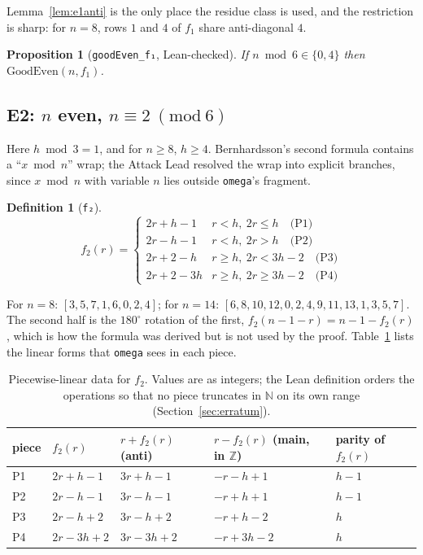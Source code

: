 \documentclass[11pt,a4paper]{article}
\newtheorem{proposition}[theorem]{Proposition}
\theoremstyle{definition}
\newtheorem{definition}[theorem]{Definition}
\theoremstyle{remark}
\newcommand{\lean}[1]{\texttt{#1}}
\newcommand{\N}{\mathbb{N}}
\newcommand{\GoodEven}{\mathrm{GoodEven}}
\begin{document}
Lemma~\ref{lem:e1anti} is the only place the residue class is used, and the restriction is
sharp: for $n=8$, rows $1$ and $4$ of $f_1$ share anti-diagonal $4$.

\begin{proposition}[\lean{goodEven\_f₁}, Lean-checked]
If $n\bmod 6\in\{0,4\}$ then $\GoodEven(n,f_1)$.
\end{proposition}

\subsection{E2: \texorpdfstring{$n$ even, $n \equiv 2 \ (\mathrm{mod}\ 6)$}{n even, n = 2 (mod 6)}}

Here $h\bmod 3=1$, and for $n\ge 8$, $h\ge 4$. Bernhardsson's second formula contains a
``$x \bmod n$'' wrap; the Attack Lead resolved the wrap into explicit branches, since
$x\bmod n$ with variable $n$ lies outside \lean{omega}'s fragment.

\begin{definition}[\lean{f₂}]
\[
f_2(r)=
\begin{cases}
2r+h-1 & r<h,\ 2r\le h \quad\text{(P1)}\\
2r-h-1 & r<h,\ 2r> h \quad\text{(P2)}\\
2r+2-h & r\ge h,\ 2r<3h-2 \quad\text{(P3)}\\
2r+2-3h & r\ge h,\ 2r\ge 3h-2 \quad\text{(P4)}
\end{cases}
\]
\end{definition}

For $n=8$: $[3,5,7,1,6,0,2,4]$; for $n=14$:
$[6,8,10,12,0,2,4,9,11,13,1,3,5,7]$. The second half is the $180^\circ$ rotation of the
first, $f_2(n-1-r)=n-1-f_2(r)$, which is how the formula was derived but is not used by the
proof. Table~\ref{tab:e2} lists the linear forms that \lean{omega} sees in each piece.

\begin{table}[ht]
\centering\small
\begin{tabular}{@{}lllll@{}}
\toprule
piece & $f_2(r)$ & $r+f_2(r)$ (anti) & $r-f_2(r)$ (main, in $\mathbb Z$) & parity of $f_2(r)$ \\
\midrule
P1 & $2r+h-1$ & $3r+h-1$ & $-r-h+1$ & $h-1$ \\
P2 & $2r-h-1$ & $3r-h-1$ & $-r+h+1$ & $h-1$ \\
P3 & $2r-h+2$ & $3r-h+2$ & $-r+h-2$ & $h$ \\
P4 & $2r-3h+2$ & $3r-3h+2$ & $-r+3h-2$ & $h$ \\
\bottomrule
\end{tabular}
\caption{Piecewise-linear data for $f_2$. Values are as integers; the Lean definition
orders the operations so that no piece truncates in $\N$ on its own range
(Section~\ref{sec:erratum}).}
\label{tab:e2}
\end{table}
\end{document}
